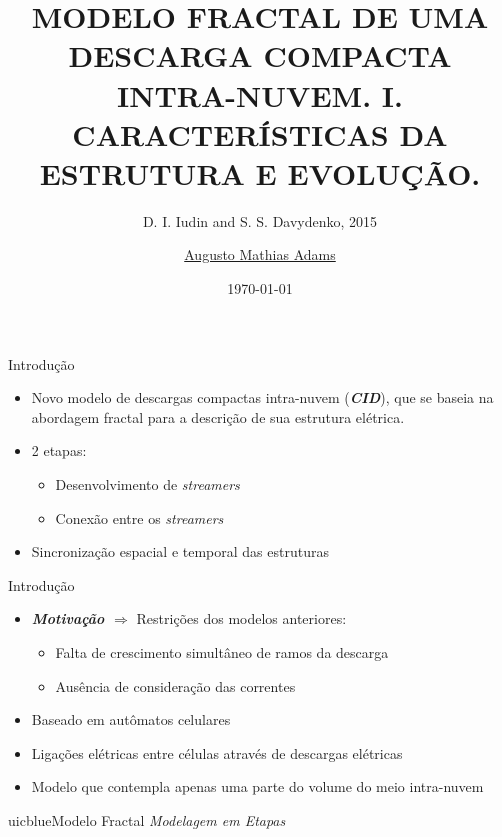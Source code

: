 \documentclass{beamer}
\title{MODELO FRACTAL DE UMA DESCARGA COMPACTA INTRA-NUVEM. I. CARACTERÍSTICAS DA ESTRUTURA E EVOLUÇÃO.}
\subtitle{D. I. Iudin and S. S. Davydenko, 2015}
\author{\href{mailto:augusto.adamns@ufpr.br}{Augusto Mathias Adams}}
\date{\today}
\begin{document}
\maketitle
{}

\begin{frame}{Introdução}
	\begin{itemize}
		\item Novo modelo de descargas compactas intra-nuvem (\textbf{\textit{CID}}), que se baseia na abordagem fractal para a descrição de sua estrutura elétrica.
		\item 2 etapas:
		\begin{itemize}
			\item Desenvolvimento de \textit{streamers}
			\item Conexão entre os \textit{streamers}
		\end{itemize}
		\item Sincronização espacial e temporal das estruturas
	\end{itemize}
\end{frame}

\begin{frame}{Introdução}
	\begin{itemize}
		\item \textit{\textbf{\alert{Motivação $\Rightarrow$}}} Restrições dos modelos anteriores:
		\begin{itemize}
			\item Falta de crescimento simultâneo de ramos da descarga
			\item Ausência de consideração das correntes
		\end{itemize}
		\item Baseado em autômatos celulares
		\item Ligações elétricas entre células através de descargas elétricas
		\item Modelo que contempla apenas uma parte do volume do meio intra-nuvem
	\end{itemize}
\end{frame}

\begin{chapter}{uicblue}{Modelo Fractal}
\textit{Modelagem em Etapas}
\end{chapter}
\end{document}

